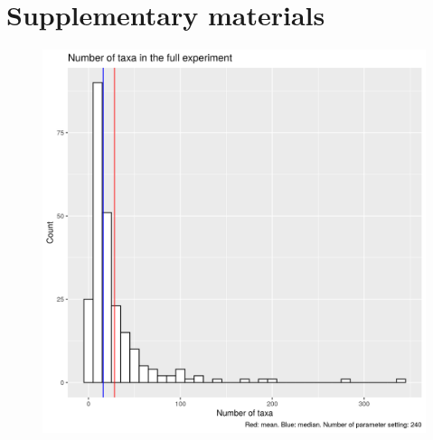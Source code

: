 \section{Supplementary materials}

\begin{figure}[!htbp]
  \includegraphics[width=\textwidth]{20190905_fig_n_taxa.png}
  \label{fig:n_taxa}
\end{figure}


